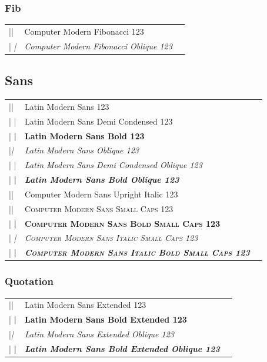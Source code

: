 \documentclass[a4paper]{article}
\makeatletter
\newenvironment{vrb}{\begin{tabular}{@{}p{5cm}ll@{}}}{\end{tabular}}
\makeatother
\begin{document}
\subsubsection*{Fib}

\selectfont
\begin{vrb}
|\fontfamily{cmfib}\selectfont | & {Computer Modern Fibonacci 123} \\
|  \slshape| & {\slshape Computer Modern Fibonacci Oblique 123} \\
\end{vrb}

\subsection*{Sans}

\sffamily
\begin{vrb}
|\sffamily| & {Latin Modern Sans 123} \\
|  \fontseries{sbc}\selectfont| & {\fontseries{sbc}\selectfont Latin Modern Sans Demi Condensed 123} \\
|  \bfseries| & {\bfseries Latin Modern Sans Bold 123} \\
|\slshape| & {\slshape Latin Modern Sans Oblique 123} \\
|  \fontseries{sbc}\selectfont| & {\fontseries{sbc}\selectfont\slshape Latin Modern Sans Demi Condensed Oblique 123} \\
|  \bfseries| & {\bfseries\slshape Latin Modern Sans Bold Oblique 123} \\
|\uishape| & {\uishape Computer Modern Sans Upright Italic 123} \\
|\scshape| & {\scshape Computer Modern Sans Small Caps 123} \\
|  \bfseries| & {\bfseries\scshape Computer Modern Sans Bold Small Caps 123} \\
|  \itshape| & {\itshape\scshape Computer Modern Sans Italic Small Caps 123} \\
|    \bfseries| & {\itshape\bfseries\scshape Computer Modern Sans Italic Bold Small Caps 123} \\
\end{vrb}

\subsubsection*{Quotation}

\qtstyle
\begin{vrb}
|\qtstyle | & {Latin Modern Sans Extended 123} \\
|  \bfseries | & {\bfseries Latin Modern Sans Bold Extended 123} \\
|\slshape | & {\slshape Latin Modern Sans Extended Oblique 123} \\
|  \bfseries | & {\bfseries\slshape Latin Modern Sans Bold Extended Oblique 123} \\
\end{vrb}
\end{document}
